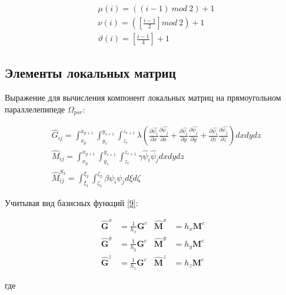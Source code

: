 \documentclass[12pt, a4paper]{article}
\begin{document}
\begin{align}
  &\mu(i) = ((i-1)\ mod\ 2) + 1 \\
  &\nu(i) = \left(\left[ \frac{i-1}{2} \right] mod\ 2\right) + 1 \\
  &\vartheta(i) = \left[ \frac{i-1}{4} \right] + 1
\end{align}

\subsection{Элементы локальных матриц}

\noindent Выражение для вычисления компонент локальных матриц на прямоугольном параллелепипеде $\Omega_{psr}$:

\begin{align}
  &\hat{G}_{ij} = \int_{x_p}^{x_{p+1}}
                  \int_{y_s}^{y_{s+1}}
                  \int_{z_r}^{z_{r+1}}
                    \lambda(
                      \frac{\partial{\hat{\psi_i}}}{\partial{x}}
                      \frac{\partial{\hat{\psi_j}}}{\partial{x}} +
                      \frac{\partial{\hat{\psi_i}}}{\partial{y}}
                      \frac{\partial{\hat{\psi_j}}}{\partial{y}} +
                      \frac{\partial{\hat{\psi_i}}}{\partial{z}}
                      \frac{\partial{\hat{\psi_j}}}{\partial{z}}
                    )dxdydz \\[1ex]
  &\hat{M}_{ij} = \int_{x_p}^{x_{p+1}}
                  \int_{y_s}^{y_{s+1}}
                  \int_{z_r}^{z_{r+1}}
                  \gamma\hat{\psi}_i\hat{\psi}_j dxdydz \\[1ex]
  &\hat{M}_{ij}^{S_3} = \int_{\xi_1}^{\xi_2}
                        \int_{\zeta_1}^{\zeta_2}
                        \beta\psi_{i}\psi_{j} d\xi d\zeta
\end{align}

\vspace{5mm}
\noindent Учитывая вид базисных функций \ref{9}:

\begin{align*}
  \hat{\textbf{G}}^x &= \frac{1}{h_x}\textbf{G}^c & \hat{\textbf{M}}^x &= h_x\textbf{M}^c \\
  \hat{\textbf{G}}^y &= \frac{1}{h_y}\textbf{G}^c & \hat{\textbf{M}}^y &= h_y\textbf{M}^c \\
  \hat{\textbf{G}}^z &= \frac{1}{h_z}\textbf{G}^c & \hat{\textbf{M}}^z &= h_z\textbf{M}^c
\end{align*}

\noindent где
\end{document}
